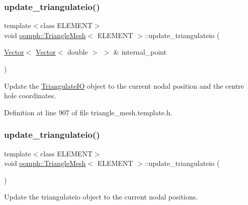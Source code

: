 \subsubsection{\texorpdfstring{update\+\_\+triangulateio()}{update\_triangulateio()}\hspace{0.1cm}{\footnotesize\ttfamily [1/2]}}
{\footnotesize\ttfamily template$<$class E\+L\+E\+M\+E\+NT$>$ \\
void \hyperlink{classoomph_1_1TriangleMesh}{oomph\+::\+Triangle\+Mesh}$<$ E\+L\+E\+M\+E\+NT $>$\+::update\+\_\+triangulateio (\begin{DoxyParamCaption}\item[{\hyperlink{classoomph_1_1Vector}{Vector}$<$ \hyperlink{classoomph_1_1Vector}{Vector}$<$ double $>$ $>$ \&}]{internal\+\_\+point }\end{DoxyParamCaption})\hspace{0.3cm}{\ttfamily [inline]}}



Update the \hyperlink{structoomph_1_1TriangulateIO}{Triangulate\+IO} object to the current nodal position and the centre hole coordinates. 



Definition at line 907 of file triangle\+\_\+mesh.\+template.\+h.

\mbox{\label{classoomph_1_1TriangleMesh_a27153961f8b691a4cd50bd6c83ffc4d3}} 
\subsubsection{\texorpdfstring{update\+\_\+triangulateio()}{update\_triangulateio()}\hspace{0.1cm}{\footnotesize\ttfamily [2/2]}}
{\footnotesize\ttfamily template$<$class E\+L\+E\+M\+E\+NT$>$ \\
void \hyperlink{classoomph_1_1TriangleMesh}{oomph\+::\+Triangle\+Mesh}$<$ E\+L\+E\+M\+E\+NT $>$\+::update\+\_\+triangulateio (\begin{DoxyParamCaption}{ }\end{DoxyParamCaption})\hspace{0.3cm}{\ttfamily [inline]}}



Update the triangulateio object to the current nodal positions. 



